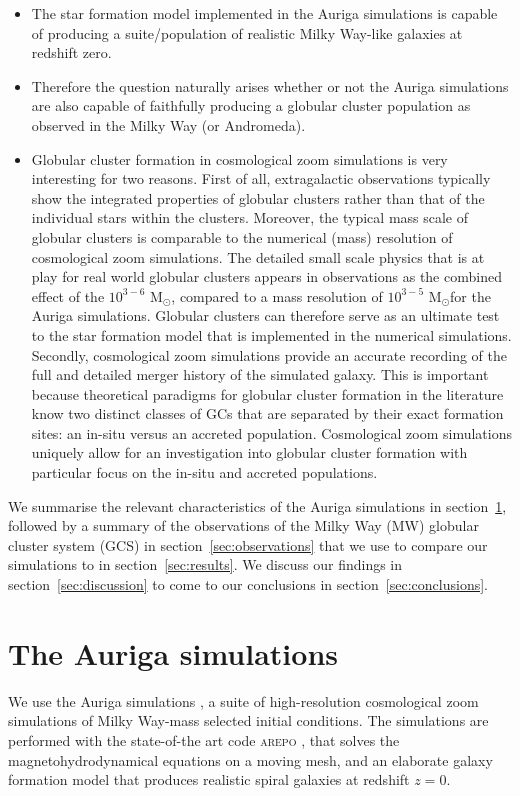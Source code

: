\documentclass[a4paper,fleqn,usenatbib]{mnras}
\newcommand{\Sun}[0]{\ensuremath{_{\odot}}}
\begin{document}
\begin{itemize}
    \item The star formation model implemented in the Auriga simulations is capable of producing a suite/population of realistic Milky Way-like galaxies at redshift zero.
    \item Therefore the question naturally arises whether or not the Auriga simulations are also capable of faithfully producing a globular cluster population as observed in the Milky Way (or Andromeda).
    \item Globular cluster formation in cosmological zoom simulations is very interesting for two reasons. First of all, extragalactic observations typically show the integrated properties of globular clusters rather than that of the individual stars within the clusters. Moreover, the typical mass scale of globular clusters is comparable to the numerical (mass) resolution of cosmological zoom simulations. The detailed small scale physics that is at play for real world globular clusters appears in observations as the combined effect of the $10^{3-6}$ M\Sun, compared to a mass resolution of $10^{3-5}$ M\Sun for the Auriga simulations. Globular clusters can therefore serve as an ultimate test to the star formation model that is implemented in the numerical simulations. Secondly, cosmological zoom simulations provide an accurate recording of the full and detailed merger history of the simulated galaxy. This is important because theoretical paradigms for globular cluster formation in the literature know two distinct classes of GCs that are separated by their exact formation sites: an in-situ versus an accreted population. Cosmological zoom simulations uniquely allow for an investigation into globular cluster formation with particular focus on the in-situ and accreted populations.
\end{itemize}


We summarise the relevant characteristics of the Auriga simulations in
section~\ref{sec:auriga}, followed by a summary of the observations of the
Milky Way (MW) globular cluster system (GCS) in section~\ref{sec:observations}
that we use to compare our simulations to in section~\ref{sec:results}. We
discuss our findings in section~\ref{sec:discussion} to come to our conclusions
in section~\ref{sec:conclusions}.


\section{The Auriga simulations}
\label{sec:auriga}
We use the Auriga simulations \citep[][hereafter G17]{2017MNRAS.467..179G}, a
suite of high-resolution cosmological zoom simulations of Milky Way-mass
selected initial conditions. The simulations are performed with the
state-of-the art code \textsc{arepo} \citep{2010MNRAS.401..791S,
2016MNRAS.455.1134P}, that solves the magnetohydrodynamical equations on a
moving mesh, and an elaborate galaxy formation model that produces realistic
spiral galaxies at redshift $z=0$.
\end{document}
